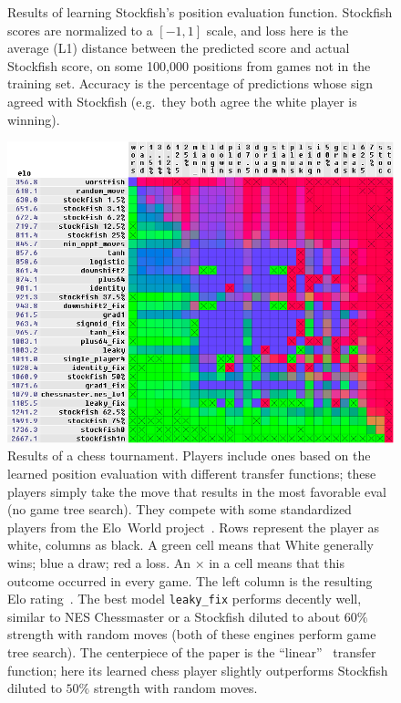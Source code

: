 \documentclass[twocolumn]{article}
\begin{document}
\begin{figure}[tp]
  \begin{center}
    
  \end{center}
  \caption{
    Results of learning Stockfish's position evaluation function.
    Stockfish scores are normalized to a $[-1, 1]$ scale, and loss
    here is the average (L1) distance between the predicted score
    and actual Stockfish score, on some 100,000 positions from
    games not in the training set. Accuracy is the percentage of
    predictions whose sign agreed with Stockfish (e.g.~they both
    agree the white player is winning).
  } \label{fig:chessresults}
\end{figure}

\begin{figure}[tp]
  \begin{center}
    \includegraphics[width=\linewidth]{elo}
  \end{center}
  \caption{ Results of a chess tournament. Players include ones based
    on the learned position evaluation with different transfer
    functions; these players simply take the move that results in the
    most favorable eval (no game tree search). They compete with some
    standardized players from the Elo~World
    project~\cite{murphy2019eloworld}. Rows represent the player as
    white, columns as black. A green cell means that White generally
    wins; blue a draw; red a loss. An $\times$ in a cell means that
    this outcome occurred in every game. The left column is the
    resulting Elo rating~\cite{elo1978rating}. The best model
    {\tt leaky\_fix} performs decently well, similar to NES Chessmaster
    or a Stockfish diluted to about $60\%$ strength with random
    moves (both of these engines perform game tree search). The
    centerpiece of the paper is the ``linear'' \gradone\ transfer
    function; here its learned chess player slightly outperforms
    Stockfish diluted to $50\%$ strength with random moves.
  } \label{fig:elo}
\end{figure}
\end{document}
